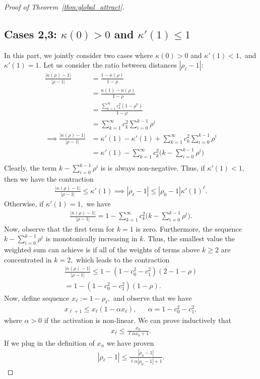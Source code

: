 \documentclass[twoside]{article}
\theoremstyle{definition}
\begin{document}
\begin{proof}[Proof of Theorem~\ref{thm:global_attract}]
\subsection*{Cases 2,3: $\kappa(0)>0$ and $\kappa'(1)\le 1$} In this part, we jointly consider two cases where $\kappa(0)>0$ and $\kappa'(1) < 1,$ and $\kappa'(1)=1.$ Let us consider the ratio between distances $|\rho_\ell-1|$:
\begin{align*}
    \frac{|\kappa(\rho)-1|}{|\rho-1|} &= \frac{1-\kappa(\rho)}{1-\rho} \\
    &=\frac{\kappa(1)-\kappa(\rho)}{1-\rho}\\
    &=\frac{\sum_{k=1}^\infty c_k^2 (1-\rho^k)}{1-\rho}\\
    &=\sum_{k=1}^\infty c_k^2 \sum_{i=0}^{k-1}\rho^i\\
\implies \frac{|\kappa(\rho)-1|}{|\rho-1|} &=\kappa'(1)-\kappa'(1)+\sum_{k=1}^\infty c_k^2 \sum_{i=0}^{k-1} \rho^i\\
&= \kappa'(1)-\sum_{k=1}^\infty c_k^2 \big(k-\sum_{i=0}^{k-1} \rho^i\big)\\
\end{align*}
Clearly, the term $k-\sum_{i=0}^{k-1} \rho^i$ is is always non-negative. Thus, if $\kappa'(1)<1,$ then we have the contraction 
\begin{align*}
    \frac{|\kappa(\rho)-1|}{|\rho-1|} \le \kappa'(1) \implies |\rho_\ell-1| \le |\rho_0-1| \kappa'(1)^\ell.
\end{align*}
Otherwise, if $\kappa'(1)=1,$ we have 
\begin{align*}
    \frac{|\kappa(\rho)-1|}{|\rho-1|} = 1-\sum_{k=1}^\infty c_k^2 \big(k-\sum_{i=0}^{k-1} \rho^i\big).
\end{align*}
Now, observe that the first term for $k=1$ is zero. Furthermore, the sequence $k-\sum_{i=0}^{k-1}\rho^i$ is monotonically increasing in $k$. Thus, the smallest value the weighted sum can achieve is if all of the weights of terms above $k\ge 2$ are concentrated in $k=2,$ which leads to the contraction
\begin{align*}
    \frac{|\kappa(\rho)-1|}{|\rho-1|} \le 1-(1-c_0^2-c_1^2)(2-1-\rho) \\
    = 1- (1-c_0^2-c_1^2) (1-\rho).
\end{align*}
Now, define sequence $x_\ell:= 1-\rho_\ell,$ and observe that we have 
\begin{align*}
    x_{\ell+1} \le x_\ell (1-\alpha x_\ell), && \alpha = 1-c_0^2-c_1^2,
\end{align*}
where $\alpha > 0$ if the activation is non-linear. 
We can prove inductively that 
\begin{align*}
x_\ell\le \frac{x_0}{\ell\alpha x_0 + 1}.
\end{align*}
If we plug in the definition of $x_n$ we have proven
\begin{align*}
|\rho_\ell-1| \le \frac{|\rho_0-1|}{\ell \alpha |\rho_0-1| + 1}.
\end{align*}


\end{proof}
\end{document}

